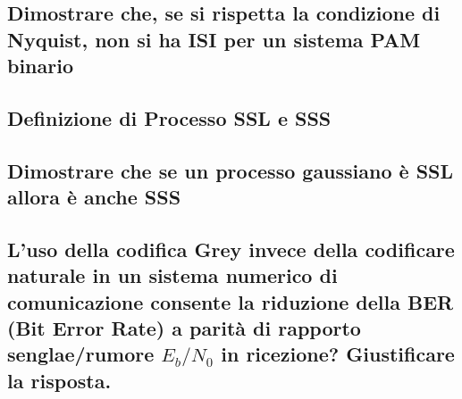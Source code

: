 \documentclass[12pt,oneside,openany]{memoir}
\numberwithin{equation}{subsection}
\begin{document}

\subsection{Dimostrare che, se si rispetta la condizione di Nyquist, non si ha
ISI per un sistema PAM binario}


\subsection{Definizione di Processo SSL e SSS}


\subsection{Dimostrare che se un processo gaussiano \`e SSL allora \`e anche
SSS}


\subsection{L'uso della codifica Grey invece della codificare naturale in un
sistema numerico di comunicazione consente la riduzione della BER (Bit Error
Rate) a parit\`a di rapporto senglae/rumore $E_b/N_0$ in ricezione? Giustificare
la risposta.}
\end{document}
